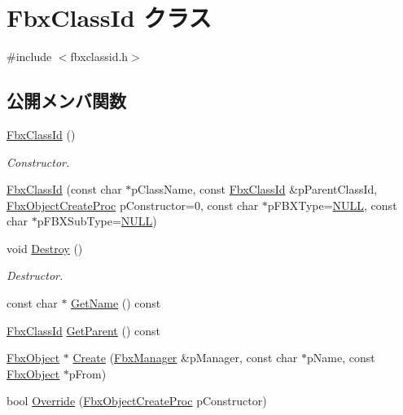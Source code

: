 \hypertarget{class_fbx_class_id}{}\section{Fbx\+Class\+Id クラス}
\label{class_fbx_class_id}


{\ttfamily \#include $<$fbxclassid.\+h$>$}

\subsection*{公開メンバ関数}
\begin{DoxyCompactItemize}
\item 
\hyperlink{class_fbx_class_id_afb4ee8374e852a1ea03c6c057ce15da8}{Fbx\+Class\+Id} ()
\begin{DoxyCompactList}\small\item\em Constructor. \end{DoxyCompactList}\item 
\hyperlink{class_fbx_class_id_ab475f340c10f7fc47f694d591e0b05a8}{Fbx\+Class\+Id} (const char $\ast$p\+Class\+Name, const \hyperlink{class_fbx_class_id}{Fbx\+Class\+Id} \&p\+Parent\+Class\+Id, \hyperlink{fbxclassid_8h_a12707e967b73358bdb4956b72e5aa449}{Fbx\+Object\+Create\+Proc} p\+Constructor=0, const char $\ast$p\+F\+B\+X\+Type=\hyperlink{fbxarch_8h_a070d2ce7b6bb7e5c05602aa8c308d0c4}{N\+U\+LL}, const char $\ast$p\+F\+B\+X\+Sub\+Type=\hyperlink{fbxarch_8h_a070d2ce7b6bb7e5c05602aa8c308d0c4}{N\+U\+LL})
\item 
void \hyperlink{class_fbx_class_id_ab720ad680937b89844a07d3bc7fcd445}{Destroy} ()
\begin{DoxyCompactList}\small\item\em Destructor. \end{DoxyCompactList}\item 
const char $\ast$ \hyperlink{class_fbx_class_id_ad9ec390d9c134c57f76ccfcbe448b1c5}{Get\+Name} () const
\item 
\hyperlink{class_fbx_class_id}{Fbx\+Class\+Id} \hyperlink{class_fbx_class_id_a5805c5b91800c43aeab75d12398080b8}{Get\+Parent} () const
\item 
\hyperlink{class_fbx_object}{Fbx\+Object} $\ast$ \hyperlink{class_fbx_class_id_a25765b5f1823d8416918bac07b9b493c}{Create} (\hyperlink{class_fbx_manager}{Fbx\+Manager} \&p\+Manager, const char $\ast$p\+Name, const \hyperlink{class_fbx_object}{Fbx\+Object} $\ast$p\+From)
\item 
bool \hyperlink{class_fbx_class_id_ac73f4b211d566fac0f811e6616c79979}{Override} (\hyperlink{fbxclassid_8h_a12707e967b73358bdb4956b72e5aa449}{Fbx\+Object\+Create\+Proc} p\+Constructor)

\end{DoxyCompactItemize}
